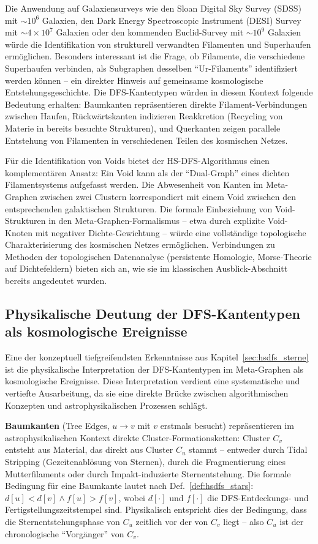 ﻿\documentclass[a4paper,12pt]{report}
\theoremstyle{definition}
\begin{document}
Die Anwendung auf Galaxiensurveys wie den Sloan Digital Sky Survey (SDSS) mit $\sim 10^6$ Galaxien, den Dark Energy Spectroscopic Instrument (DESI) Survey mit $\sim 4 \times 10^7$ Galaxien oder den kommenden Euclid-Survey mit $\sim 10^9$ Galaxien würde die Identifikation von strukturell verwandten Filamenten und Superhaufen ermöglichen. Besonders interessant ist die Frage, ob Filamente, die verschiedene Superhaufen verbinden, als Subgraphen desselben ``Ur-Filaments'' identifiziert werden können -- ein direkter Hinweis auf gemeinsame kosmologische Entstehungsgeschichte. Die DFS-Kantentypen würden in diesem Kontext folgende Bedeutung erhalten: Baumkanten repräsentieren direkte Filament-Verbindungen zwischen Haufen, Rückwärtskanten indizieren Reakkretion (Recycling von Materie in bereits besuchte Strukturen), und Querkanten zeigen parallele Entstehung von Filamenten in verschiedenen Teilen des kosmischen Netzes.

Für die Identifikation von Voids bietet der HS-DFS-Algorithmus einen komplementären Ansatz: Ein Void kann als der ``Dual-Graph'' eines dichten Filamentsystems aufgefasst werden. Die Abwesenheit von Kanten im Meta-Graphen zwischen zwei Clustern korrespondiert mit einem Void zwischen den entsprechenden galaktischen Strukturen. Die formale Einbeziehung von Void-Strukturen in den Meta-Graphen-Formalismus -- etwa durch explizite Void-Knoten mit negativer Dichte-Gewichtung -- würde eine vollständige topologische Charakterisierung des kosmischen Netzes ermöglichen. Verbindungen zu Methoden der topologischen Datenanalyse (persistente Homologie, Morse-Theorie auf Dichtefeldern) bieten sich an, wie sie im klassischen Ausblick-Abschnitt bereits angedeutet wurden.

\subsection{Physikalische Deutung der DFS-Kantentypen als kosmologische Ereignisse}

Eine der konzeptuell tiefgreifendsten Erkenntnisse aus Kapitel~\ref{sec:hsdfs_sterne} ist die physikalische Interpretation der DFS-Kantentypen im Meta-Graphen als kosmologische Ereignisse. Diese Interpretation verdient eine systematische und vertiefte Ausarbeitung, da sie eine direkte Brücke zwischen algorithmischen Konzepten und astrophysikalischen Prozessen schlägt.

\textbf{Baumkanten} (Tree Edges, $u \to v$ mit $v$ erstmals besucht) repräsentieren im astrophysikalischen Kontext direkte Cluster-Formationsketten: Cluster $C_v$ entsteht aus Material, das direkt aus Cluster $C_u$ stammt -- entweder durch Tidal Stripping (Gezeitenablösung von Sternen), durch die Fragmentierung eines Mutterfilaments oder durch Impakt-induzierte Sternentstehung. Die formale Bedingung für eine Baumkante lautet nach Def.~\ref{def:hsdfs_stars}: $d[u] < d[v] \wedge f[u] > f[v]$, wobei $d[\cdot]$ und $f[\cdot]$ die DFS-Entdeckungs- und Fertigstellungszeitstempel sind. Physikalisch entspricht dies der Bedingung, dass die Sternentstehungsphase von $C_u$ zeitlich vor der von $C_v$ liegt -- also $C_u$ ist der chronologische ``Vorgänger'' von $C_v$.
\end{document}
